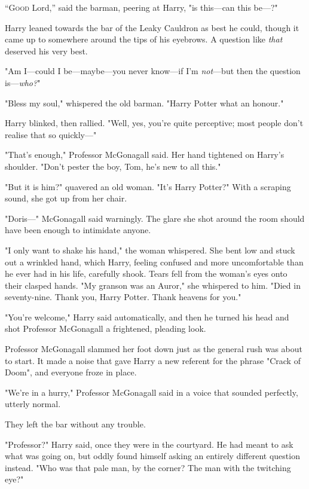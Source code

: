 
\lettrine{“G}{ood} Lord,'' said the barman, peering at Harry, "is this—can this be—?"

Harry leaned towards the bar of the Leaky Cauldron as best he could, though it
came up to somewhere around the tips of his eyebrows. A question like
\emph{that} deserved his very best.

"Am I—could I be—maybe—you never know—if I'm \emph{not}—but then the
question is—\emph{who?}"

"Bless my soul," whispered the old barman. "Harry Potter{\el} what an
honour."

Harry blinked, then rallied. "Well, yes, you're quite perceptive; most people
don't realise that so quickly—"

"That's enough," Professor McGonagall said. Her hand tightened on Harry's
shoulder. "Don't pester the boy, Tom, he's new to all this."

"But it is him?" quavered an old woman. "It's Harry Potter?" With a scraping
sound, she got up from her chair.

"Doris—" McGonagall said warningly. The glare she shot around the room should
have been enough to intimidate anyone.

"I only want to shake his hand," the woman whispered. She bent low and stuck
out a wrinkled hand, which Harry, feeling confused and more uncomfortable than
he ever had in his life, carefully shook. Tears fell from the woman's eyes onto
their clasped hands. "My granson was an Auror," she whispered to him. "Died in
seventy-nine. Thank you, Harry Potter. Thank heavens for you."

"You're welcome," Harry said automatically, and then he turned his head and
shot Professor McGonagall a frightened, pleading look.

Professor McGonagall slammed her foot down just as the general rush was about
to start. It made a noise that gave Harry a new referent for the phrase "Crack
of Doom", and everyone froze in place.

"We're in a hurry," Professor McGonagall said in a voice that sounded
perfectly, utterly normal.

They left the bar without any trouble.

"Professor?" Harry said, once they were in the courtyard. He had meant to ask
what was going on, but oddly found himself asking an entirely different
question instead. "Who was that pale man, by the corner? The man with the
twitching eye?"

